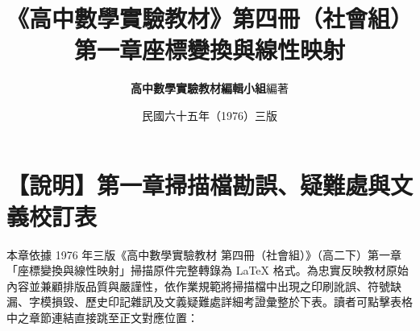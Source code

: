 \documentclass[a4paper,12pt,twoside]{article}
\title{\LARGE\textbf{《高中數學實驗教材》第四冊（社會組）}\\[0.5em] \Large\textbf{第一章\quad 座標變換與線性映射}}
\author{\textbf{高中數學實驗教材編輯小組}\quad 編著}
\date{民國六十五年（1976）三版}
\begin{document}
\maketitle
\thispagestyle{firstpage}

\section*{【說明】第一章掃描檔勘誤、疑難處與文義校訂表}
\label{sec:errata_notes_b4_ch1}
\label{sec:current_errata}

本章依據 1976 年三版《高中數學實驗教材 第四冊（社會組）》（高二下）第一章「座標變換與線性映射」掃描原件完整轉錄為 \LaTeX{} 格式。為忠實反映教材原始內容並兼顧排版品質與嚴謹性，依作業規範將掃描檔中出現之印刷訛誤、符號缺漏、字模損毀、歷史印記雜訊及文義疑難處詳細考證彙整於下表。讀者可點擊表格中之章節連結直接跳至正文對應位置：
\end{document}
